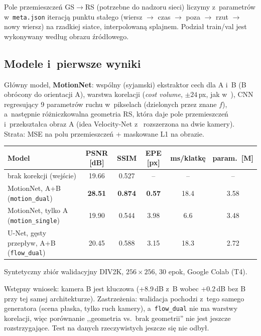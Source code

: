 \documentclass[11pt,a4paper]{article}
\begin{document}
Pole przemieszczeń GS$\to$RS (potrzebne do nadzoru sieci) liczymy z~parametrów w~\texttt{meta.json}
iteracją punktu stałego (wiersz $\to$ czas $\to$ poza $\to$ rzut $\to$ nowy wiersz) na rzadkiej
siatce, interpolowaną splajnem. Podział train/val jest wykonywany według obrazu źródłowego.

\subsection{Modele i~pierwsze wyniki}
Główny model, \textbf{MotionNet}: wspólny (syjamski) ekstraktor cech dla A i~B (B obrócony
do orientacji A), warstwa korelacji (\emph{cost volume}, $\pm24$\,px, jak w~\cite{flownet,pwcnet}),
CNN regresujący 9 parametrów ruchu w~pikselach (dzielonych przez znane $f$), a~następnie
różniczkowalna geometria RS, która daje pole przemieszczeń i~przekształca obraz A
(idea Velocity-Net z~\cite{zhuang2019} rozszerzona na dwie kamery).
Strata: MSE na polu przemieszczeń + maskowane L1 na obrazie.

\begin{center}
\small
\begin{tabular}{lccccc}
\toprule
Model & PSNR [dB] & SSIM & EPE [px] & ms/klatkę & param.\ [M] \\
\midrule
brak korekcji (wejście) & 19.66 & 0.527 & -- & -- & -- \\
\rowcolor{ikcol!8} MotionNet, A+B (\texttt{motion\_dual}) & \textbf{28.51} & \textbf{0.874} & \textbf{0.57} & 18.4 & 3.58 \\
MotionNet, tylko A (\texttt{motion\_single}) & 19.90 & 0.544 & 3.98 & 6.6 & 3.48 \\
U-Net, gęsty przepływ, A+B (\texttt{flow\_dual}) & 20.45 & 0.588 & 3.15 & 18.3 & 2.72 \\
\bottomrule
\end{tabular}

\smallskip
{\footnotesize Syntetyczny zbiór walidacyjny DIV2K, $256\times256$, 30 epok, Google Colab (T4).}
\end{center}

Wstępny wniosek: kamera B jest kluczowa (+8.9\,dB z~B wobec +0.2\,dB bez B przy tej samej
architekturze). Zastrzeżenia: walidacja pochodzi z~tego samego generatora (scena płaska, tylko
ruch kamery), a~\texttt{flow\_dual} nie ma warstwy korelacji, więc porównanie
,,geometria vs.\ brak geometrii'' nie jest jeszcze rozstrzygające. Test na danych rzeczywistych
jeszcze się nie odbył.

\end{document}

